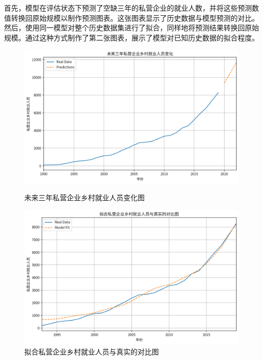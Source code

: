 首先，模型在评估状态下预测了空缺三年的私营企业的就业人数，并将这些预测数值转换回原始规模以制作预测图表。这张图表显示了历史数据与模型预测的对比。然后，使用同一模型对整个历史数据集进行了拟合，同样地将预测结果转换回原始规模。通过这种方式制作了第二张图表，展示了模型对已知历史数据的拟合程度。

\begin{figure}[h]
    \centering
    \begin{minipage}{0.45\linewidth}
        \centering
        \includegraphics[width=\linewidth]{figures/22.png}
        \caption{未来三年私营企业乡村就业人员变化图}
        \label{fig:prediction_private}
    \end{minipage}\hfill
    \begin{minipage}{0.45\linewidth}
        \centering
        \includegraphics[width=\linewidth]{figures/23.png}
        \caption{拟合私营企业乡村就业人员与真实的对比图}
        \label{fig:fit-vs-real_private}
    \end{minipage}
\end{figure}

